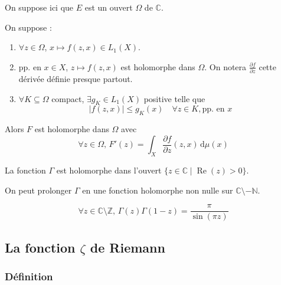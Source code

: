   On suppose ici que $E$ est un ouvert $\Omega$ de $\mathbb{C}$.

  \begin{theorem}
    On suppose :
    \begin{enumerate}[label={\bfseries(\roman*)}]
      \item $\forall z \in \Omega$, $x \mapsto f(z,x) \in L_1(X)$.
      \item pp. en $x \in X$, $z \mapsto f(z,x)$ est holomorphe dans $\Omega$. On notera $\frac{\partial f}{\partial z}$ cette dérivée définie presque partout.
      \item $\forall K \subseteq \Omega$ compact, $\exists g_K \in L_1(X)$ positive telle que
      \[ \left| f(z,x) \right| \leq g_K(x) \quad \forall z \in K, \text{pp. en } x \]
    \end{enumerate}
    Alors $F$ est holomorphe dans $\Omega$ avec
    \[ \forall z \in \Omega, \, F'(z) = \int_X \frac{\partial f}{\partial z}(z, x) \, \mathrm{d}\mu(x) \]
  \end{theorem}


  \begin{example}
    La fonction $\Gamma$ est holomorphe dans l'ouvert $\{ z \in \mathbb{C} \mid \operatorname{Re}(z) > 0 \}$.
  \end{example}

  \begin{theorem}
    On peut prolonger $\Gamma$ en une fonction holomorphe non nulle sur $\mathbb{C} \setminus -\mathbb{N}$.
  \end{theorem}


  \begin{theorem}
    \[ \forall z \in \mathbb{C} \setminus \mathbb{Z}, \, \Gamma(z) \Gamma(1-z) = \frac{\pi}{\sin(\pi z)} \]
  \end{theorem}

  \subsection{La fonction \texorpdfstring{$\zeta$}{Zeta} de Riemann}

  \subsubsection{Définition}


